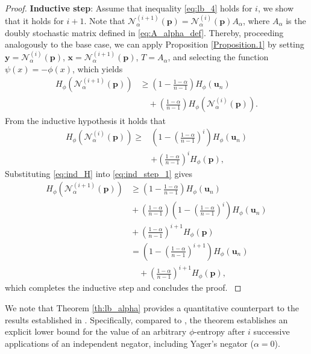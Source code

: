 \documentclass[pdflatex,sn-basic,iicol]{sn-jnl}%
\theoremstyle{thmstyleone}%
\theoremstyle{thmstyletwo}%
\theoremstyle{thmstylethree}%
\newcommand{\N}{\mathcal{N}}
\newcommand{\bp}{\mathbf{p}}
\newcommand{\bu}{\mathbf{u}}
\newcommand{\x}{\mathbf{x}}
\newcommand{\y}{\mathbf{y}}
\begin{document}
\begin{proof}
{    \smallskip
    \noindent
    \textbf{Inductive step}: Assume that inequality \eqref{eq:lb_4} holds for $i$, we show that it holds for $i+1$. Note that $\N_\alpha^{(i+1)}(\bp)=\N_\alpha^{(i)}(\bp)A_\alpha$, where $A_\alpha$ is the doubly stochastic matrix defined in \eqref{eq:A_alpha_def}. Thereby, proceeding analogously to the base case, we can apply  Proposition \ref{Proposition.1} by setting $\y=\N_\alpha^{(i)}(\bp)$, $\x=\N_\alpha^{(i+1)}(\bp)$, $T=A_\alpha$, and selecting the function $\psi(x)=-\phi(x)$, which yields
    \begin{align}\label{eq:ind_step_1}
         H_\phi(\N_\alpha^{(i+1)}(\bp)) &\geq \left(1-\frac{1-\alpha}{n-1}\right)H_\phi(\bu_n)\nonumber\\&\quad+\left(\frac{1-\alpha}{n-1}\right) H_\phi(\N_\alpha^{(i)}(\bp)).
    \end{align}
    From the inductive hypothesis it holds that
    \begin{align}\label{eq:ind_H}
    H_\phi(\N_\alpha^{(i)}(\bp)) \geq &\left(1-\left(\frac{1-\alpha}{n-1}\right)^i\right)H_\phi(\bu_n) \nonumber \\ &+\left(\frac{1-\alpha}{n-1}\right)^i H_\phi(\bp),
    \end{align}
    Substituting \eqref{eq:ind_H} into  \eqref{eq:ind_step_1} gives
    \begin{align*}
         H_\phi(\N_\alpha^{(i+1)}(\bp)) &\geq \left(1-\frac{1-\alpha}{n-1}\right)H_\phi(\bu_n)\\&\!\!+\left(\frac{1-\alpha}{n-1}\right) \left(1-\left(\frac{1-\alpha}{n-1}\right)^i\right)H_\phi(\bu_n)\\
         &\!\!+\left(\frac{1-\alpha}{n-1}\right)^{i+1}H_\phi(\bp)\\
         &=\left(1-\left(\frac{1-\alpha}{n-1}\right)^{i+1}\right)H_\phi(\bu_n) \nonumber \\ &\quad+\left(\frac{1-\alpha}{n-1}\right)^{i+1} H_\phi(\bp),
    \end{align*}
    which completes the inductive step and concludes the proof.
    }
\end{proof}
We note that Theorem \ref{th:lb_alpha} provides a quantitative counterpart to the results established in  \citep{klein2022some}. Specifically, compared to \cite{klein2022some}, the theorem establishes an explicit lower bound for the value of an arbitrary $\phi$-entropy after $i$ successive applications of an independent negator, including Yager's negator ($\alpha=0$). 
\end{document}
